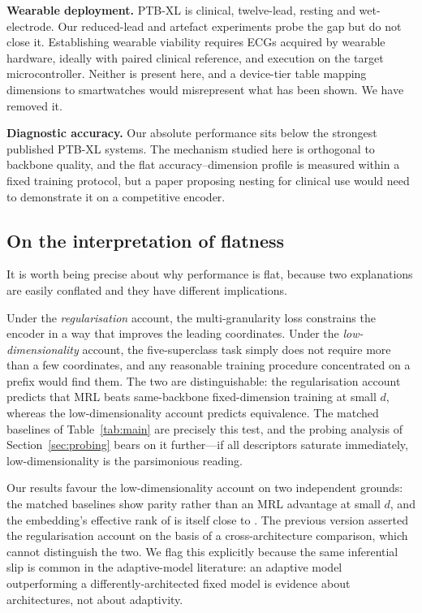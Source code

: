 \textbf{Wearable deployment.} PTB-XL is clinical, twelve-lead, resting and
wet-electrode. Our reduced-lead and artefact experiments probe the gap but do
not close it. Establishing wearable viability requires ECGs acquired by
wearable hardware, ideally with paired clinical reference, and execution on the
target microcontroller. Neither is present here, and a device-tier table
mapping dimensions to smartwatches would misrepresent what has been shown. We
have removed it.

\textbf{Diagnostic accuracy.} Our absolute performance sits below the
strongest published PTB-XL systems. The mechanism studied here is orthogonal
to backbone quality, and the flat accuracy--dimension profile is measured
within a fixed training protocol, but a paper proposing nesting for clinical
use would need to demonstrate it on a competitive encoder.

\subsection{On the interpretation of flatness}

It is worth being precise about why performance is flat, because two
explanations are easily conflated and they have different implications.

Under the \emph{regularisation} account, the multi-granularity loss constrains
the encoder in a way that improves the leading coordinates. Under the
\emph{low-dimensionality} account, the five-superclass task simply does not
require more than a few coordinates, and any reasonable training procedure
concentrated on a prefix would find them. The two are distinguishable: the
regularisation account predicts that MRL beats same-backbone fixed-dimension
training at small $d$, whereas the low-dimensionality account predicts
equivalence. The matched baselines of Table~\ref{tab:main} are precisely this
test, and the probing analysis of Section~\ref{sec:probing} bears on it
further---if all descriptors saturate immediately, low-dimensionality is the
parsimonious reading.

Our results favour the low-dimensionality account on two independent
grounds: the matched baselines show parity rather than an MRL advantage at
small $d$, and the embedding's effective rank of  is itself close
to . The previous version asserted the regularisation account on
the basis of a cross-architecture comparison, which cannot distinguish the
two. We flag this
explicitly because the same inferential slip is common in the adaptive-model
literature: an adaptive model outperforming a differently-architected fixed
model is evidence about architectures, not about adaptivity.

